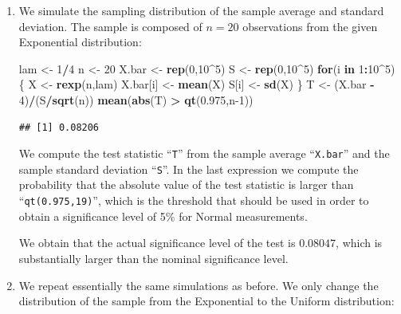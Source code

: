 \documentclass[]{krantz}
\makeatletter
\newenvironment{Shaded}{\begin{snugshade}}{\end{snugshade}}
\newcommand{\ControlFlowTok}[1]{\textcolor[rgb]{0.13,0.29,0.53}{\textbf{#1}}}
\newcommand{\DecValTok}[1]{\textcolor[rgb]{0.00,0.00,0.81}{#1}}
\newcommand{\FloatTok}[1]{\textcolor[rgb]{0.00,0.00,0.81}{#1}}
\newcommand{\KeywordTok}[1]{\textcolor[rgb]{0.13,0.29,0.53}{\textbf{#1}}}
\newcommand{\NormalTok}[1]{#1}
\newcommand{\OperatorTok}[1]{\textcolor[rgb]{0.81,0.36,0.00}{\textbf{#1}}}
\newcommand{\StringTok}[1]{\textcolor[rgb]{0.31,0.60,0.02}{#1}}
\newenvironment{kframe}{%
\medskip{}
\setlength{\fboxsep}{.8em}
 \def\at@end@of@kframe{}%
 \ifinner\ifhmode%
  \def\at@end@of@kframe{\end{minipage}}%
  \begin{minipage}{\columnwidth}%
 \fi\fi%
 \def\FrameCommand##1{\hskip\@totalleftmargin \hskip-\fboxsep
 \colorbox{shadecolor}{##1}\hskip-\fboxsep
     \hskip-\linewidth \hskip-\@totalleftmargin \hskip\columnwidth}%
 \MakeFramed {\advance\hsize-\width
   \@totalleftmargin\z@ \linewidth\hsize
   \@setminipage}}%
 {\par\unskip\endMakeFramed%
 \at@end@of@kframe}
\renewenvironment{Shaded}{\begin{kframe}}{\end{kframe}}
\theoremstyle{definition}
\theoremstyle{definition}
\theoremstyle{definition}
\theoremstyle{remark}
\makeatother
\begin{document}
\begin{enumerate}
\def\labelenumi{\arabic{enumi}.}
\item
  We simulate the sampling distribution
  of the sample average and standard deviation. The sample is composed of
  \(n=20\) observations from the given Exponential distribution:

\begin{Shaded}
\begin{Highlighting}[]
\NormalTok{lam <-}\StringTok{ }\DecValTok{1}\OperatorTok{/}\DecValTok{4}
\NormalTok{n <-}\StringTok{ }\DecValTok{20}
\NormalTok{X.bar <-}\StringTok{ }\KeywordTok{rep}\NormalTok{(}\DecValTok{0}\NormalTok{,}\DecValTok{10}\OperatorTok{^}\DecValTok{5}\NormalTok{)}
\NormalTok{S <-}\StringTok{ }\KeywordTok{rep}\NormalTok{(}\DecValTok{0}\NormalTok{,}\DecValTok{10}\OperatorTok{^}\DecValTok{5}\NormalTok{)}
\ControlFlowTok{for}\NormalTok{(i }\ControlFlowTok{in} \DecValTok{1}\OperatorTok{:}\DecValTok{10}\OperatorTok{^}\DecValTok{5}\NormalTok{) \{}
\NormalTok{  X <-}\StringTok{ }\KeywordTok{rexp}\NormalTok{(n,lam)}
\NormalTok{  X.bar[i] <-}\StringTok{ }\KeywordTok{mean}\NormalTok{(X)}
\NormalTok{  S[i] <-}\StringTok{ }\KeywordTok{sd}\NormalTok{(X)}
\NormalTok{\}}
\NormalTok{T <-}\StringTok{ }\NormalTok{(X.bar }\OperatorTok{-}\StringTok{ }\DecValTok{4}\NormalTok{)}\OperatorTok{/}\NormalTok{(S}\OperatorTok{/}\KeywordTok{sqrt}\NormalTok{(n))}
\KeywordTok{mean}\NormalTok{(}\KeywordTok{abs}\NormalTok{(T) }\OperatorTok{>}\StringTok{ }\KeywordTok{qt}\NormalTok{(}\FloatTok{0.975}\NormalTok{,n}\DecValTok{-1}\NormalTok{))}
\end{Highlighting}
\end{Shaded}

\begin{verbatim}
## [1] 0.08206
\end{verbatim}

  We compute the test statistic ``\texttt{T}'' from the sample average ``\texttt{X.bar}''
  and the sample standard deviation ``\texttt{S}''. In the last expression we
  compute the probability that the absolute value of the test statistic is
  larger than ``\texttt{qt(0.975,19)}'', which is the threshold that should be used
  in order to obtain a significance level of 5\% for Normal measurements.

  We obtain that the actual significance level of the test is \(0.08047\),
  which is substantially larger than the nominal significance level.
\item
  We repeat essentially the same
  simulations as before. We only change the distribution of the sample
  from the Exponential to the Uniform distribution:


\end{enumerate}
\end{document}

